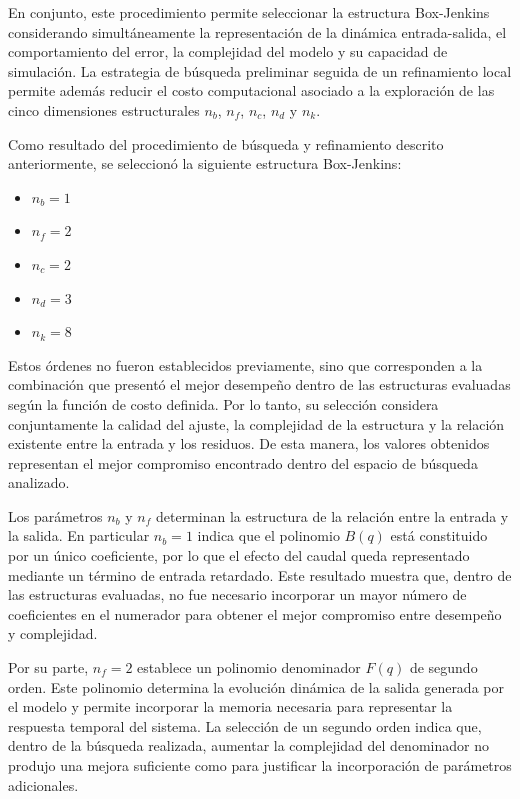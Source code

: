 \documentclass[11pt]{report}
\begin{document}
En conjunto, este procedimiento permite seleccionar la estructura Box-Jenkins considerando simultáneamente la representación de la dinámica entrada-salida, el comportamiento del error, la complejidad del modelo y su capacidad de simulación. La estrategia de búsqueda preliminar seguida de un refinamiento local permite además reducir el costo computacional asociado a la exploración de las cinco dimensiones estructurales $n_b$, $n_f$, $n_c$, $n_d$ y $n_k$.

Como resultado del procedimiento de búsqueda y refinamiento descrito anteriormente, se seleccionó la siguiente estructura Box-Jenkins:
\begin{itemize}
    \item $n_b=1$
    \item $n_f=2$
    \item $n_c=2$
    \item $n_d=3$
    \item $n_k=8$
\end{itemize}
Estos órdenes no fueron establecidos previamente, sino que corresponden a la combinación que presentó el mejor desempeño dentro de las estructuras evaluadas según la función de costo definida. Por lo tanto, su selección considera conjuntamente la calidad del ajuste, la complejidad de la estructura y la relación existente entre la entrada y los residuos. De esta manera, los valores obtenidos representan el mejor compromiso encontrado dentro del espacio de búsqueda analizado.


Los parámetros $n_b$ y $n_f$ determinan la estructura de la relación entre la entrada y la salida. En particular $n_b=1$ indica que el polinomio $B(q)$ está constituido por un único coeficiente, por lo que el efecto del caudal queda representado mediante un término de entrada retardado. Este resultado muestra que, dentro de las estructuras evaluadas, no fue necesario incorporar un mayor número de coeficientes en el numerador para obtener el mejor compromiso entre desempeño y complejidad.

Por su parte, $n_f=2$ establece un polinomio denominador $F(q)$ de segundo orden. Este polinomio determina la evolución dinámica de la salida generada por el modelo y permite incorporar la memoria necesaria para representar la respuesta temporal del sistema. La selección de un segundo orden indica que, dentro de la búsqueda realizada, aumentar la complejidad del denominador no produjo una mejora suficiente como para justificar la incorporación de parámetros adicionales.
\end{document}

